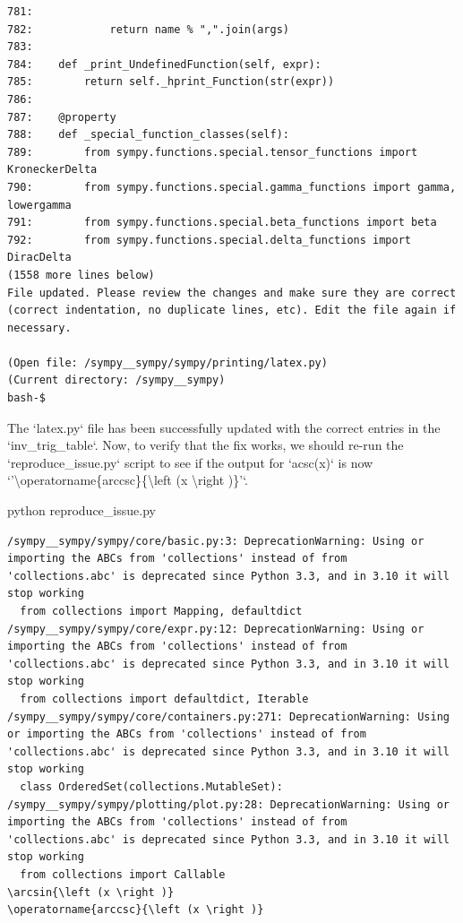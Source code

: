 {\begin{observationbox}
\begin{Verbatim}[breaklines=true, breakanywhere=true]
781:
782:            return name % ",".join(args)
783:
784:    def _print_UndefinedFunction(self, expr):
785:        return self._hprint_Function(str(expr))
786:
787:    @property
788:    def _special_function_classes(self):
789:        from sympy.functions.special.tensor_functions import KroneckerDelta
790:        from sympy.functions.special.gamma_functions import gamma, lowergamma
791:        from sympy.functions.special.beta_functions import beta
792:        from sympy.functions.special.delta_functions import DiracDelta
(1558 more lines below)
File updated. Please review the changes and make sure they are correct (correct indentation, no duplicate lines, etc). Edit the file again if necessary.

(Open file: /sympy__sympy/sympy/printing/latex.py)
(Current directory: /sympy__sympy)
bash-$
\end{Verbatim}
\end{observationbox}
\begin{agentbox}
The `latex.py` file has been successfully updated with the correct entries in the `inv\_trig\_table`. Now, to verify that the fix works, we should re-run the `reproduce\_issue.py` script to see if the output for `acsc(x)` is now `'{\textbackslash}operatorname\{arccsc\}\{{\textbackslash}left (x {\textbackslash}right )\}'`.



\hrulefill
\begin{CodeVerbatim}[breaklines=true, breakanywhere=true]
python reproduce_issue.py
\end{CodeVerbatim}
\end{agentbox}
\begin{observationbox}\begin{Verbatim}[breaklines=true, breakanywhere=true]
/sympy__sympy/sympy/core/basic.py:3: DeprecationWarning: Using or importing the ABCs from 'collections' instead of from 'collections.abc' is deprecated since Python 3.3, and in 3.10 it will stop working
  from collections import Mapping, defaultdict
/sympy__sympy/sympy/core/expr.py:12: DeprecationWarning: Using or importing the ABCs from 'collections' instead of from 'collections.abc' is deprecated since Python 3.3, and in 3.10 it will stop working
  from collections import defaultdict, Iterable
/sympy__sympy/sympy/core/containers.py:271: DeprecationWarning: Using or importing the ABCs from 'collections' instead of from 'collections.abc' is deprecated since Python 3.3, and in 3.10 it will stop working
  class OrderedSet(collections.MutableSet):
/sympy__sympy/sympy/plotting/plot.py:28: DeprecationWarning: Using or importing the ABCs from 'collections' instead of from 'collections.abc' is deprecated since Python 3.3, and in 3.10 it will stop working
  from collections import Callable
\arcsin{\left (x \right )}
\operatorname{arccsc}{\left (x \right )}


\end{Verbatim}
\end{observationbox}}
